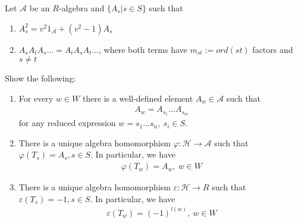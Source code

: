 \documentclass[]{article}
\begin{document}
\begin{exercise}
    Let \(\mathscr{A}\) be an \(R\)-algebra and \(\{A_s | s \in S\}\) such that
    \begin{enumerate}[label=\arabic*)]
        \item \(A_s^2 = v^2 1_\mathscr{A} + (v^2-1) A_s\)
        \label{first}
        \item \(A_s A_t A_s \dots = A_t A_s A_t \dots\), where both terms have \(m_{st}:=ord(st)\) factors and \(s \neq t\)
        \label{(M)}
    \end{enumerate}
    Show the following:
    \begin{enumerate}
        \item For every \(w \in W\) there is a well-defined element \(A_w \in \mathscr{A}\) such that 
            \begin{align*}
                A_w = A_{s_1} \dots A_{s_m}
            \end{align*}
        for any reduced expression \(w = s_1 \dots s_n, \ s_i \in S\). 
        \item There is a unique algebra homomorphism \(\varphi: \mathscr{H} \rightarrow \mathscr{A}\) such that \(\varphi(T_s)= A_s, s \in S\). 
        In particular, we have
        \begin{align*}
            \varphi(T_w) = A_w, \ w \in W
        \end{align*}
        \item There is a unique algebra homomorphism \(\varepsilon: \mathscr{H} \rightarrow R\) such that \(\varepsilon(T_s)= -1, s \in S\). 
        In particular, we have
        \begin{align*}
            \varepsilon(T_w)= (-1)^{l(w)}, \ w \in W
        \end{align*}
    \end{enumerate}
\end{exercise}
\end{document}
